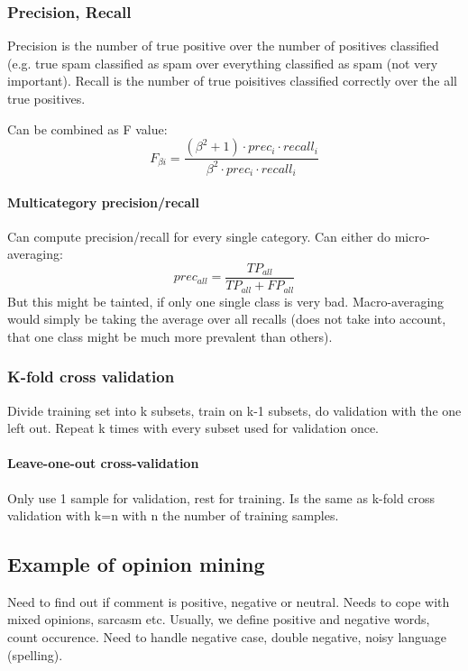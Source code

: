 \documentclass[11pt]{article}
\begin{document}
\subsubsection{Precision, Recall}
Precision is the number of true positive over the number of positives classified
(e.g. true spam classified as spam over everything classified as spam (not very important).
Recall is the number of true poisitives classified correctly over the all true positives.

Can be combined as F value:
\begin{equation}
	F_{\beta i} = \frac{(\beta^2 + 1)\cdot prec_i \cdot recall_i}{\beta^2 \cdot prec_i \cdot recall_i}
\end{equation}
\paragraph{Multicategory precision/recall}
Can compute precision/recall for every single category. Can either do micro-averaging:
\begin{equation}
	prec_{all} = \frac{TP_{all}}{TP_{all} + FP_{all}}
\end{equation}
But this might be tainted, if only one single class is very bad. Macro-averaging would simply be taking the average over all recalls (does not take into
account, that one class might be much more prevalent than others). 

\subsubsection{K-fold cross validation}
Divide training set into k subsets, train on k-1 subsets, do validation with the one left out. Repeat k times with every subset used for validation once.
\paragraph{Leave-one-out cross-validation}
Only use 1 sample for validation, rest for training. Is the same as k-fold cross validation
with k=n with n the number of training samples.

\subsection{Example of opinion mining}
Need to find out if comment is positive, negative or neutral. Needs to cope with mixed
opinions, sarcasm etc. Usually, we define positive and negative words, count occurence. 
Need to handle negative case, double negative, noisy language (spelling).
\end{document}
